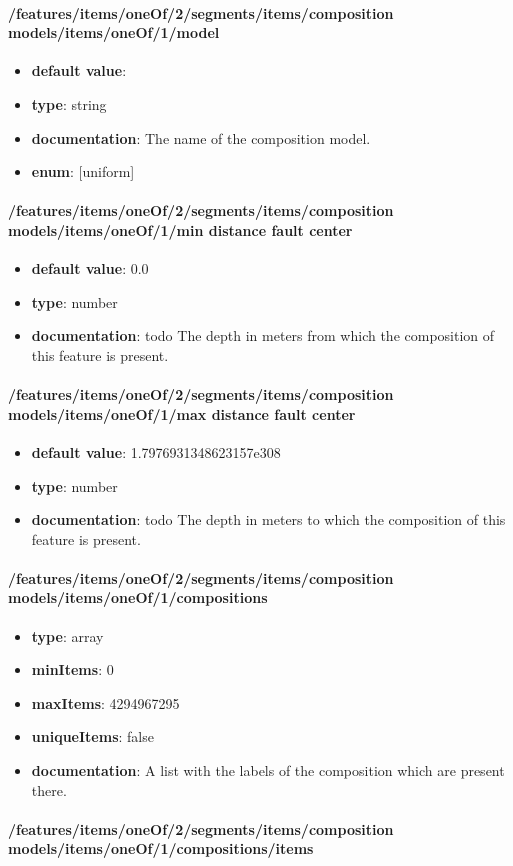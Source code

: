 \paragraph{/features/items/oneOf/2/segments/items/composition models/items/oneOf/1/model}
\begin{itemize}\item {\bf default value}: 
\item {\bf type}: string
\item {\bf documentation}: The name of the composition model.
\item {\bf enum}: [uniform]\end{itemize}\paragraph{/features/items/oneOf/2/segments/items/composition models/items/oneOf/1/min distance fault center}
\begin{itemize}\item {\bf default value}: 0.0
\item {\bf type}: number
\item {\bf documentation}: todo The depth in meters from which the composition of this feature is present.
\end{itemize}\paragraph{/features/items/oneOf/2/segments/items/composition models/items/oneOf/1/max distance fault center}
\begin{itemize}\item {\bf default value}: 1.7976931348623157e308
\item {\bf type}: number
\item {\bf documentation}: todo The depth in meters to which the composition of this feature is present.
\end{itemize}\paragraph{/features/items/oneOf/2/segments/items/composition models/items/oneOf/1/compositions}
\begin{itemize}\item {\bf type}: array
\item {\bf minItems}: 0
\item {\bf maxItems}: 4294967295
\item {\bf uniqueItems}: false
\item {\bf documentation}: A list with the labels of the composition which are present there.
\end{itemize}\paragraph{/features/items/oneOf/2/segments/items/composition models/items/oneOf/1/compositions/items}

